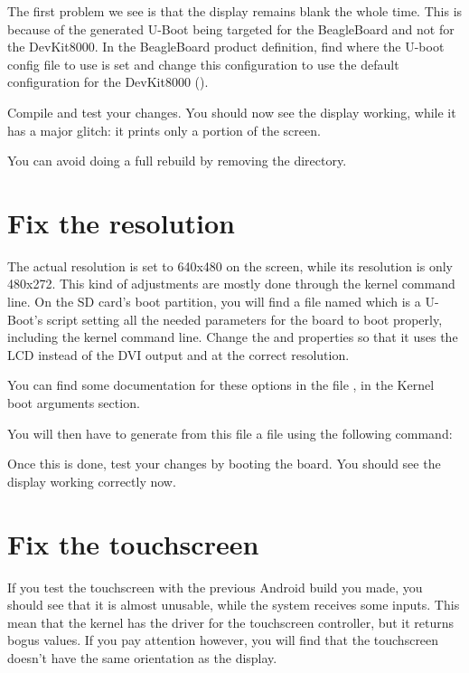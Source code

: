 The first problem we see is that the display remains blank the whole time. This
is because of the generated U-Boot being targeted for the BeagleBoard and not
for the DevKit8000. In the BeagleBoard product definition, find where the U-boot
config file to use is set and change this configuration to use the default
configuration for the DevKit8000 ().

Compile and test your changes. You should now see the display working, while it
has a major glitch: it prints only a portion of the screen.

You can avoid doing a full rebuild by removing the
 directory.

\section{Fix the resolution}

The actual resolution is set to 640x480 on the screen, while its resolution is
only 480x272. This kind of adjustments are mostly done through the kernel
command line. On the SD card's boot partition, you will find a file named
 which is a U-Boot's script setting all the needed parameters for the
board to boot properly, including the kernel command line. Change the
 and  properties so that it uses the LCD instead of
the DVI output and at the correct resolution.

You can find some documentation for these options in the file
, in the Kernel boot arguments section.

You will then have to generate from this  file a  file
using the following command:


Once this is done, test your changes by booting the board. You should see the
display working correctly now.

\section{Fix the touchscreen}

If you test the touchscreen with the previous Android build you made, you should
see that it is almost unusable, while the system receives some inputs. This mean
that the kernel has the driver for the touchscreen controller, but it returns
bogus values. If you pay attention however, you will find that the touchscreen
doesn't have the same orientation as the display.

